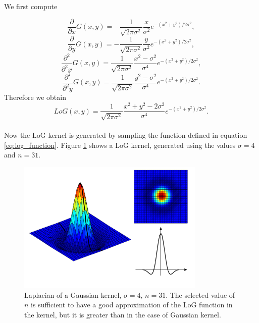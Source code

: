 \documentclass{ipol}
\numberwithin{equation}{section}
\numberwithin{table}{section}
\begin{document}
We first compute

\begin{equation} 
	\frac{\partial}{\partial x}G(x,y)=-\frac{1}{\sqrt{2\pi\sigma^2}}\frac{x}{\sigma^2}e^{-(x^2+y^2)/2\sigma^2},
\end{equation}
\begin{equation} 
	\frac{\partial}{\partial y}G(x,y)=-\frac{1}{\sqrt{2\pi\sigma^2}}\frac{y}{\sigma^2}e^{-(x^2+y^2)/2\sigma^2},
\end{equation}
\begin{equation} 
	\frac{\partial^2}{\partial^2 x}G(x,y)=\frac{1}{\sqrt{2\pi\sigma^2}}\frac{x^2-\sigma^2}{\sigma^4}e^{-(x^2+y^2)/2\sigma^2},
\end{equation}
\begin{equation} 
	\frac{\partial^2}{\partial^2 y}G(x,y)=\frac{1}{\sqrt{2\pi\sigma^2}}\frac{y^2-\sigma^2}{\sigma^4}e^{-(x^2+y^2)/2\sigma^2}.
\end{equation}
Therefore we obtain
\begin{equation}
	\label{eq:log_function}
	LoG(x,y)=\frac{1}{\sqrt{2\pi\sigma^2}}\frac{x^2+y^2-2\sigma^2}{\sigma^4}e^{-(x^2+y^2)/2\sigma^2}.
\end{equation}\\

Now the LoG kernel is generated by sampling the function defined in equation \ref{eq:log_function}. 
Figure \ref{fig:log_kernel} shows a LoG kernel, generated using the values $\sigma=4$ and $n=31$.

\begin{figure}[ht]
	\centering
	\includegraphics[width=0.8\textwidth]{kernel_log.pdf}
	\caption{Laplacian of a Gaussian kernel, $\sigma=4$, $n=31$. The selected value of $n$ is sufficient 
to have a good approximation of the LoG function in the kernel, but it is greater than in the case of 
Gaussian kernel.}
	\label{fig:log_kernel}
\end{figure}
\end{document}

